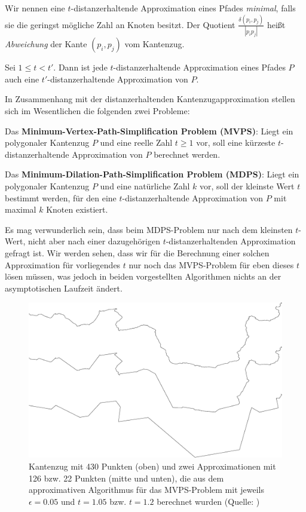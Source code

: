 	Wir nennen eine $t$-distanzerhaltende Approximation eines Pfades \emph{minimal}, falls sie die geringst mögliche Zahl an Knoten besitzt.
	Der Quotient $\frac{\delta(p_i, p_j)}{|p_ip_j|}$ heißt \emph{Abweichung} der Kante $(p_i, p_j)$ vom Kantenzug.
	\begin{corollary}
		\label{cor:approximations}
		Sei $1 \leq t < t'$. Dann ist jede $t$-distanzerhaltende Approximation eines Pfades $P$ auch eine $t'$-distanzerhaltende Approximation von $P$.
	\end{corollary}

	In Zusammenhang mit der distanzerhaltenden Kantenzugapproximation stellen sich im Wesentlichen die folgenden zwei Probleme:
	
	\noindent Das \textbf{Minimum-Vertex-Path-Simplification Problem (MVPS)}: Liegt ein polygonaler Kantenzug $P$ und eine reelle Zahl $t \geq 1$ vor, soll eine kürzeste $t$-distanzerhaltende Approximation von $P$ berechnet werden.
	
	\noindent Das \textbf{Minimum-Dilation-Path-Simplification Problem (MDPS)}: Liegt ein polygonaler Kantenzug $P$ und eine natürliche Zahl $k$ vor, soll der kleinste Wert $t$ bestimmt werden, für den eine $t$-distanzerhaltende Approximation von $P$ mit maximal $k$ Knoten existiert.
	
	Es mag verwunderlich sein, dass beim MDPS-Problem nur nach dem kleinsten $t$-Wert, nicht aber nach einer dazugehörigen $t$-distanzerhaltenden Approximation gefragt ist. 
	Wir werden sehen, dass wir für die Berechnung einer solchen Approximation für vorliegendes $t$ nur noch das MVPS-Problem für eben dieses $t$ lösen müssen, was jedoch in beiden vorgestellten Algorithmen nichts an der asymptotischen Laufzeit ändert.

    \begin{figure}
    	\centering
    	\begin{minipage}{.8\linewidth}
    		 \includegraphics[scale=0.15]{approximation_example}
    	\end{minipage}
    	\caption{Kantenzug mit 430 Punkten (oben) und zwei Approximationen mit 126 bzw. 22 Punkten (mitte und unten), die aus dem approximativen Algorithmus für das MVPS-Problem mit jeweils $\epsilon = 0.05$ und $t = 1.05$ bzw. $t = 1.2$ berechnet wurden (Quelle: \cite{gudmundsson})}
    \end{figure}